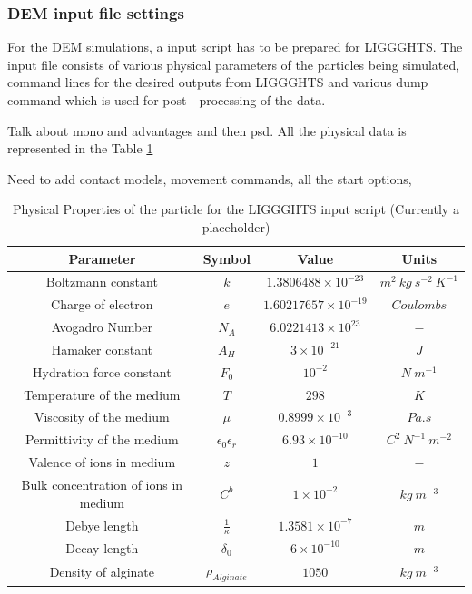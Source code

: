 \documentclass[preprint,11pt,authoryear]{elsarticle}
\begin{document}
	    \subsubsection{DEM input file settings}
	    \par For the DEM simulations, a input script has to be prepared for LIGGGHTS. The input file consists of various physical parameters of the particles being simulated, command lines for the desired outputs from LIGGGHTS and various dump command which is used for post - processing of the data.
	    \par Talk about mono and advantages and then psd. All the physical data is represented in the Table \ref{table:mthds_dem_input}
	    \par Need to add contact models, movement commands, all the start options, 
	    	\begin{table}[!htb][H]
	\caption{Physical Properties of the particle for the LIGGGHTS input script (Currently a placeholder)} \label{table:mthds_dem_input}
	\begin{center}
	\begin{tabular}{c|c|c|c}
	\hline
	\bf{Parameter} &\bf{Symbol} &\bf{Value} &\bf{Units}\\
	\hline
	Boltzmann constant & $k$ & $1.3806488 \times 10^{-23}$ & $m^2~kg~s^{-2}~K^{-1}$\\
	Charge of electron & $e$ & $1.60217657 \times 10^{-19}$ & $Coulombs$\\
	Avogadro Number & $N_A$ & $6.0221413 \times 10^{23}$ & $-$\\
	Hamaker constant & $A_H$ & $3 \times 10^{-21}$ & $J$\\
	Hydration force constant & $F_0$ & $10^{-2}$ & $N~m^{-1}$\\
	Temperature of the medium & $T$ & $298$ & $K$\\
	Viscosity of the medium & $\mu$ & $0.8999 \times 10^{-3}$ & $Pa.s$\\
	Permittivity of the medium & $\epsilon_0 \epsilon_r$ & $6.93\times 10^{-10}$ & $C^2~N^{-1}~m^{-2}$ \\
	Valence of ions in medium & $z$ & $1$ & $-$\\
	Bulk concentration of ions in medium & $C^b$ & $1 \times 10^{-2}$ & $kg~m^{-3}$\\
	Debye length & $\frac{1}{\kappa} $ & $1.3581 \times 10^{-7}$ & $m$\\
	Decay length & $\delta_0$ & $6 \times 10^{-10}$ & $m$\\
	Density of alginate & $\rho_{Alginate}$ & $1050$ & $kg~m^{-3}$ \\

\end{tabular}
\end{center}
\end{table}
\end{document}
